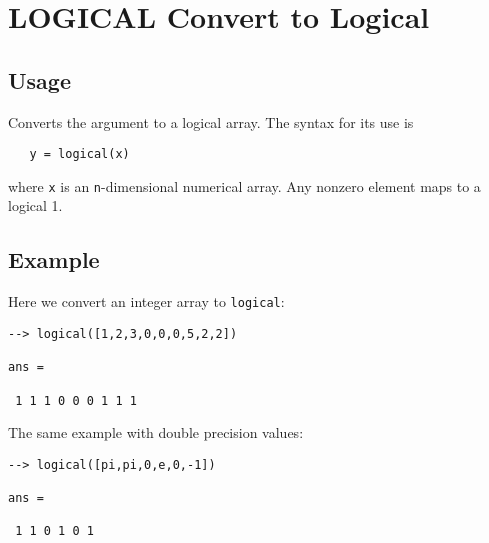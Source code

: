 \section{LOGICAL Convert to Logical}

\subsection{Usage}

Converts the argument to a logical array.  The syntax
for its use is
\begin{verbatim}
   y = logical(x)
\end{verbatim}
where \verb|x| is an \verb|n|-dimensional numerical array.  Any nonzero 
element maps to a logical 1.
\subsection{Example}

Here we convert an integer array to \verb|logical|:
\begin{verbatim}
--> logical([1,2,3,0,0,0,5,2,2])

ans = 

 1 1 1 0 0 0 1 1 1 
\end{verbatim}
The same example with double precision values:
\begin{verbatim}
--> logical([pi,pi,0,e,0,-1])

ans = 

 1 1 0 1 0 1 
\end{verbatim}
